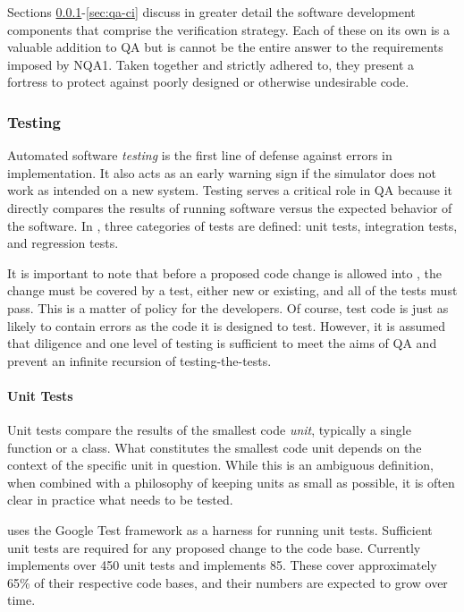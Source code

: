 Sections \ref{sec:qa-testing}-\ref{sec:qa-ci} discuss in greater detail the software 
development components that comprise the \Cyclus verification strategy.
Each of these on its own is a valuable addition to \gls{QA} but is cannot be the 
entire answer to the requirements imposed by \gls{NQA1}. Taken together and strictly 
adhered to, they present a fortress to protect against poorly designed or otherwise undesirable code.


\subsubsection{Testing}
\label{sec:qa-testing}

Automated software \emph{testing} is the first line of defense against
errors in implementation. It also acts as an early warning sign if the
simulator does not work as intended on a new system.
Testing serves a critical role in \gls{QA} because it directly compares the 
results of running software versus the expected behavior of the software.
In \Cyclus, three categories of tests are defined: unit tests, integration 
tests, and regression tests. 

It is important to note that before a proposed
code change is allowed into \Cyclus,  the change must be covered by a test, either new or existing, and all of the tests must pass.  This is a
matter of policy for the developers. Of course, test code is 
just as likely to contain errors as the code it is designed to test. 
However, it is assumed that diligence and one level of testing 
is sufficient to meet the aims of \gls{QA} and prevent an infinite recursion
of testing-the-tests.

\paragraph{Unit Tests}

Unit tests compare the results of the smallest code \emph{unit}, 
typically a single function or a class. What constitutes the smallest code
unit depends on the context of the specific unit in question. While this is 
an ambiguous definition, when combined with a philosophy of keeping units as small
as possible, it is often clear in practice what needs to be tested.

\Cyclus uses the Google Test framework \cite{inc_googletest_2008} as a harness for running unit 
tests. Sufficient unit tests are required for any proposed change to the \Cyclus
code base. Currently \Cyclus implements over 450 unit tests and \Cycamore implements 
85.  These cover approximately 65\% of their respective code bases, and their numbers are expected to grow over time. 

